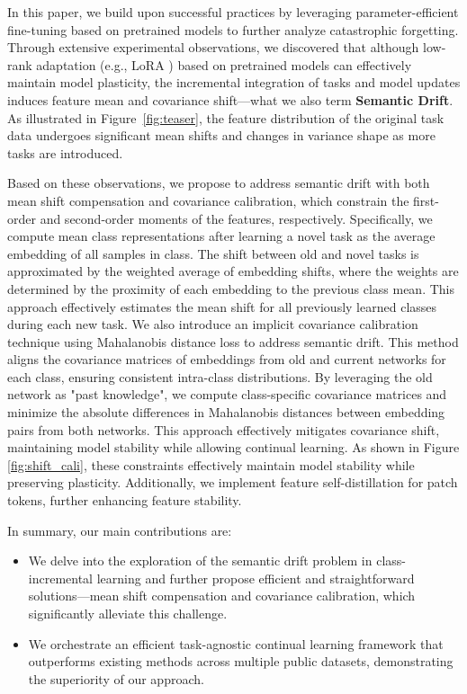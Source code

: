 In this paper, we build upon successful practices by leveraging parameter-efficient fine-tuning based on pretrained models to further analyze catastrophic forgetting. Through extensive experimental observations, we discovered that although low-rank adaptation (e.g., LoRA \cite{hu2022lora} ) based on pretrained models can effectively maintain model plasticity, the incremental integration of tasks and model updates induces feature mean and covariance shift—what we also term \textbf{Semantic Drift}. As illustrated in Figure~\ref{fig:teaser}, the feature distribution of the original task data undergoes significant mean shifts and changes in variance shape as more tasks are introduced.

Based on these observations, we propose to address semantic drift with both mean shift compensation and covariance calibration, which constrain the first-order and second-order moments of the features, respectively. Specifically, we compute mean class representations after learning a novel task as the average embedding of all samples in class. The shift between old and novel tasks is approximated by the weighted average of embedding shifts, where the weights are determined by the proximity of each embedding to the previous class mean. This approach effectively estimates the mean shift for all previously learned classes during each new task. We also introduce an implicit covariance calibration technique using Mahalanobis distance \cite{mahalanobis1936generalized} loss to address semantic drift. This method aligns the covariance matrices of embeddings from old and current networks for each class, ensuring consistent intra-class distributions. By leveraging the old network as "past knowledge", we compute class-specific covariance matrices and minimize the absolute differences in Mahalanobis distances between embedding pairs from both networks. This approach effectively mitigates covariance shift, maintaining model stability while allowing continual learning. As shown in Figure \ref{fig:shift_cali}, these constraints effectively maintain model stability while preserving plasticity. Additionally, we implement feature self-distillation for patch tokens, further enhancing feature stability.

In summary, our main contributions are:
\begin{itemize}
    \item We delve into the exploration of the semantic drift problem in class-incremental learning and further propose efficient and straightforward solutions—mean shift compensation and covariance calibration, which significantly alleviate this challenge.
    \item We orchestrate an efficient task-agnostic continual learning framework that outperforms existing methods across multiple public datasets, demonstrating the superiority of our approach.
\end{itemize}

%